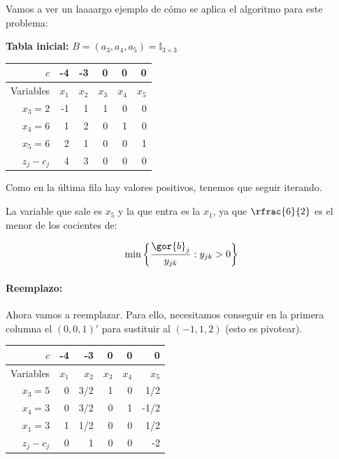 \begin{example}

Vamos a ver un laaaargo ejemplo de cómo se aplica el algoritmo para este problema:

\begin{ioprob}
\end{ioprob}


\textbf{Tabla inicial:}  $B=(a_3,a_4,a_5) = \mathbb{I}_{3\times 3}$



\begin{table}[hbtp]
\centering
\begin{tabular}{r || rr|rrr}
$c$ & -4 & -3 & 0 & 0 & 0 \\ \hline
Variables & $x_1$ & $x_2$ & $x_3$ & $x_4$ & $x_5$ \\ \hline
$x_3 = 2$ & -1 & 1 & 1 & 0 & 0 \\
$x_4=6$   & 1 & 2 & 0 & 1 & 0  \\
$x_5=6$ & 2 & 1 & 0 & 0 & 1 \\ \hline
$z_j-c_j$ & 4 & 3 & 0 & 0 & 0
\end{tabular}
\end{table}

Como en la última fila hay valores positivos, tenemos que seguir iterando.

La variable que sale es $x_5$ y la que entra es la $x_1$, ya que $\rfrac{6}{2}$ es el menor de los cocientes de:

\[\min\left\{\frac{\gor{b}_j}{y_{jk}}: y_{jk}>0\right\}\]

\paragraph{Reemplazo:}

Ahora vamos a reemplazar. Para ello, necesitamos conseguir en la primera columna el $(0,0,1)'$ para sustituir al $(-1,1,2)$ (esto es pivotear).

\begin{table}[hbtp]
\centering
\begin{tabular}{r | rrrrr}
$c$ & -4 & -3 & 0 & 0 & 0 \\ \hline
Variables & $x_1$ & $x_2$ & $x_3$ & $x_4$ & $x_5$ \\ \hline
$x_3=5$ & 0 & 3/2 & 1 & 0 & 1/2 \\
$x_4=3$   & 0 & 3/2 & 0 & 1 & -1/2  \\
$x_1=3$ & 1 & 1/2 & 0 & 0 & 1/2 \\ \hline
$z_j-c_j$ &  0 & 1 & 0 & 0 & -2
\end{tabular}
\end{table}


\end{example}
